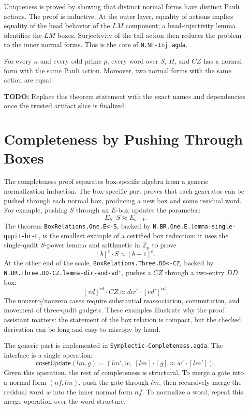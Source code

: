 \documentclass[acmsmall,screen,review,anonymous]{acmart}
\newcommand{\Zp}{\mathbb{Z}_p}
\newcommand{\Sp}{\mathrm{Sp}}
\newcommand{\code}[1]{\texttt{#1}}
\newcommand{\codepath}[1]{\nolinkurl{#1}}
\newcommand{\todo}[1]{\textbf{TODO:} #1}
\begin{document}
Uniqueness is proved by showing that distinct normal forms have distinct Pauli
actions. The proof is inductive. At the outer layer, equality of actions implies
equality of the head behavior of the \(LM\) component; a head-injectivity lemma
identifies the \(LM\) boxes. Surjectivity of the tail action then reduces the
problem to the inner normal forms. This is the core of
\code{N.NF-Inj.agda}.

\begin{theorem}[Normal forms for \(\Sp(2n,\Zp)\), mechanized]
For every \(n\) and every odd prime \(p\), every word over \(S\), \(H\), and
\(CZ\) has a normal form with the same Pauli action. Moreover, two normal forms
with the same action are equal.
\end{theorem}

\todo{Replace this theorem statement with the exact names and dependencies once
the trusted artifact slice is finalized.}

\section{Completeness by Pushing Through Boxes}
\label{sec:completeness}

The completeness proof separates box-specific algebra from a generic
normalization induction. The box-specific part proves that each generator can be
pushed through each normal box, producing a new box and some residual word. For
example, pushing \(S\) through an \(E\)-box updates the parameter:
\[
  E_b \cdot S \approx E_{b-1}.
\]
The theorem \codepath{BoxRelations.One.E<-S}, backed by
\codepath{N.BR.One.E.lemma-single-qupit-br-E}, is the smallest example of a
certified box reduction: it uses the single-qudit \(S\)-power lemma and
arithmetic in \(\Zp\) to prove
\[
  [b]^e \cdot S \approx [b-1]^e.
\]
At the other end of the scale, \codepath{BoxRelations.Three.DD<-CZ}, backed by
\codepath{N.BR.Three.DD-CZ.lemma-dir-and-vd'}, pushes a \(CZ\) through a two-entry
\(DD\) box:
\[
  [vd]^{vd} \cdot CZ \approx dir^\uparrow \cdot [vd']^{vd}.
\]
The nonzero/nonzero cases require substantial reassociation, commutation, and
movement of three-qudit gadgets. These examples illustrate why the proof
assistant matters: the statement of the box relation is compact, but the checked
derivation can be long and easy to miscopy by hand.

The generic part is implemented in \code{Symplectic-Completeness.agda}. The
interface is a single operation:
\[
  \mathsf{cosetUpdate}(lm,g)
    = (lm',w,\; [lm]\cdot[g] \approx w^\uparrow\cdot[lm']).
\]
Given this operation, the rest of completeness is structural. To merge a gate
into a normal form \((nf,lm)\), push the gate through \(lm\), then recursively
merge the residual word \(w\) into the inner normal form \(nf\). To normalize a
word, repeat this merge operation over the word structure.
\end{document}

